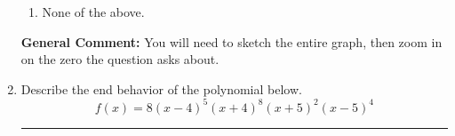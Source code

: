 \documentclass{extbook}[14pt]
\newcommand{\litem}[1]{\item #1

\rule{\textwidth}{0.4pt}}
\begin{document}
\begin{enumerate}
{\begin{enumerate}[label=\Alph*.]
\item None of the above.\end{enumerate}
\textbf{General Comment:} You will need to sketch the entire graph, then zoom in on the zero the question asks about.
}
\litem{
Describe the end behavior of the polynomial below.
\[ f(x) = 8(x - 4)^{5}(x + 4)^{8}(x + 5)^{2}(x - 5)^{4} \]

}
\end{enumerate}
\end{document}
